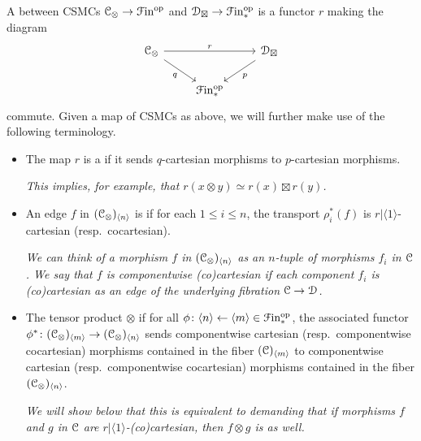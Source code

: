 \documentclass[main.tex]{subfiles}
\begin{document}
\begin{definition}
  A  between CSMCs $\mathcal{C}_{\otimes} \to \mathcal{F}\mathrm{in}^{\mathrm{op}}$ and $\mathcal{D}_{\boxtimes} \to \mathcal{F}\mathrm{in}_{*}^{\mathrm{op}}$ is a functor $r$ making the diagram
  \begin{equation*}
    \begin{tikzcd}
      \category{C}_{\otimes}
      \arrow[rr, "r"]
      \arrow[dr, swap, "q"]
      && \category{D}_{\boxtimes}
      \arrow[dl, "p"]
      \\
      & \Finp\op
    \end{tikzcd}
  \end{equation*}
  commute. Given a map of CSMCs as above, we will further make use of the following terminology.
  \begin{itemize}
    \item The map $r$ is a  if it sends $q$-cartesian morphisms to $p$-cartesian morphisms.

      \textit{This implies, for example, that $r(x \otimes y) \simeq r(x) \boxtimes r(y)$.}

    \item An edge $f$ in $(\mathcal{C}_{\otimes})_{\langle n \rangle}$ is  if for each $1 \leq i \leq n$, the transport $\rho_{i}^{*}(f)$ is $r|\langle 1 \rangle$-cartesian (resp.\ cocartesian).

      \textit{We can think of a morphism $f$ in $(\mathcal{C}_{\otimes})_{\langle n \rangle}$ as an $n$-tuple of morphisms $f_{i}$ in $\mathcal{C}$. We say that $f$ is componentwise (co)cartesian if each component $f_{i}$ is (co)cartesian as an edge of the underlying fibration $\mathcal{C} \to \mathcal{D}$.}

    \item The tensor product $\otimes$  if for all $\phi\colon \langle n \rangle \leftarrow \langle m \rangle \in \mathcal{F}\mathrm{in}_{*}^{\mathrm{op}}$, the associated functor $\phi^{*}\colon (\mathcal{C}_{\otimes})_{\langle m \rangle} \to (\mathcal{C}_{\otimes})_{\langle n \rangle}$ sends componentwise cartesian (resp.\ componentwise cocartesian) morphisms contained in the fiber $(\mathcal{C})_{\langle m \rangle}$ to componentwise cartesian (resp.\ componentwise cocartesian) morphisms contained in the fiber $(\mathcal{C}_{\otimes})_{\langle n \rangle}$.

      \textit{We will show below that this is equivalent to demanding that if morphisms $f$ and $g$ in $\mathcal{C}$ are $r|\langle 1 \rangle$-(co)cartesian, then $f \otimes g$ is as well.}


\end{itemize}
\end{definition}
\end{document}
